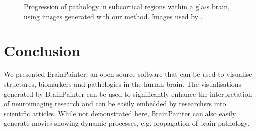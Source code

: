 \documentclass[final,times,twocolumn,authoryear]{elsarticle}
\begin{document}
\begin{figure}[htp]
\centering

 \caption{Progression of pathology in subcortical regions within a glass brain, using images generated with our method. Images used by  
 \cite{wijeratne2018image}.}
   \label{fig:peter}
\end{figure}



\section{Conclusion}

We presented BrainPainter, an open-source software that can be used to visualise structures, biomarkers and pathologies in the human brain. The visualisations generated by BrainPainter can be used to significantly enhance the interpretation of neuroimaging research and can be easily embedded by researchers into scientific articles. While not demonstrated here, BrainPainter can also easily generate movies showing dynamic processes, e.g. propagation of brain pathology. 
\end{document}
